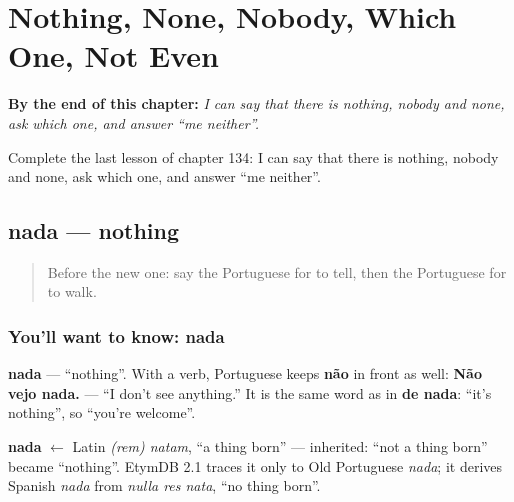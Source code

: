 
\chapter{Nothing, None, Nobody, Which One, Not Even}
\label{ch:pt-nothing-none-nobody-which-one-not-even}

\begin{chapteropening}
\textbf{By the end of this chapter:} \emph{I can say that there is nothing, nobody and none, ask which one, and answer \textquotedblleft{}me neither\textquotedblright{}.}

Complete the last lesson of chapter 134: I can say that there is nothing, nobody and none, ask which one, and answer \textquotedblleft{}me neither\textquotedblright{}.
\end{chapteropening}

\section[nada]{nada — nothing}

\label{lesson:PT-C134-nada}



\begin{quote}
Before the new one: say the Portuguese for to tell, then the Portuguese for to walk.
\end{quote}

\subsection*{You'll want to know: nada}
\textbf{nada} — \textquotedblleft{}nothing\textquotedblright{}. With a verb, Portuguese keeps \textbf{não} in front as well: \textbf{Não vejo nada.} — \textquotedblleft{}I don't see anything.\textquotedblright{} It is the same word as in \textbf{de nada}: \textquotedblleft{}it's nothing\textquotedblright{}, so \textquotedblleft{}you're welcome\textquotedblright{}.

\begin{cousinweb}
\textbf{nada} $\leftarrow$ Latin \emph{(rem) natam}, \textquotedblleft{}a thing born\textquotedblright{} — inherited: \textquotedblleft{}not a thing born\textquotedblright{} became \textquotedblleft{}nothing\textquotedblright{}. EtymDB 2.1 traces it only to Old Portuguese \emph{nada}; it derives Spanish \emph{nada} from \emph{nulla res nata}, \textquotedblleft{}no thing born\textquotedblright{}.
\end{cousinweb}

